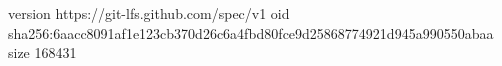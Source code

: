 version https://git-lfs.github.com/spec/v1
oid sha256:6aacc8091af1e123cb370d26c6a4fbd80fce9d25868774921d945a990550abaa
size 168431
